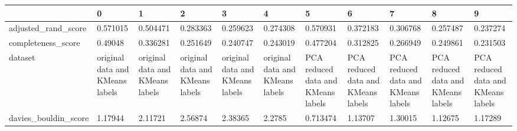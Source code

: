 \begin{tabular}{lllllllllll}
\toprule
{} &                                                  0 &                                                  1 &                                                  2 &                                                  3 &                                                  4 &                                                  5 &                                                  6 &                                                  7 &                                                  8 &                                                  9 \\
\midrule
adjusted\_rand\_score   &                                           0.571015 &                                           0.504471 &                                           0.283363 &                                           0.259623 &                                           0.274308 &                                           0.570931 &                                           0.372183 &                                           0.306768 &                                           0.257487 &                                           0.237274 \\
completeness\_score    &                                            0.49048 &                                           0.336281 &                                           0.251649 &                                           0.240747 &                                           0.243019 &                                           0.477204 &                                           0.312825 &                                           0.266949 &                                           0.249861 &                                           0.231503 \\
dataset               &                    original data and KMeans labels &                    original data and KMeans labels &                    original data and KMeans labels &                    original data and KMeans labels &                    original data and KMeans labels &                 PCA reduced data and KMeans labels &                 PCA reduced data and KMeans labels &                 PCA reduced data and KMeans labels &                 PCA reduced data and KMeans labels &                 PCA reduced data and KMeans labels \\
davies\_bouldin\_score  &                                            1.17944 &                                            2.11721 &                                            2.56874 &                                            2.38365 &                                             2.2785 &                                           0.713474 &                                            1.13707 &                                            1.30015 &                                            1.12675 &                                            1.17289 \\

\end{tabular}
